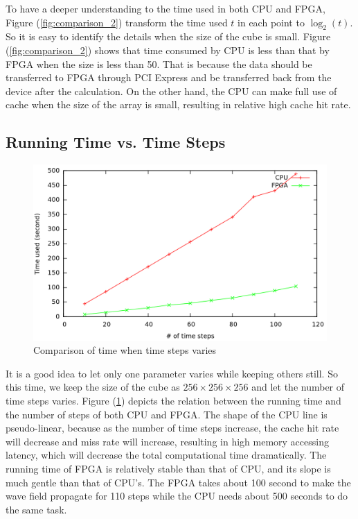 To have a deeper understanding to the time used in both CPU and FPGA,
Figure (\ref{fig:comparison_2}) transform the time used \( t \) in each
point to \(\log_2\left( t \right) \). So it is easy to identify the details
when the size of the cube is small. Figure (\ref{fig:comparison_2}) shows
that time consumed by CPU is less than that by FPGA when the size is less
than 50. That is because the data should be transferred to FPGA through PCI
Express and be transferred back from the device after the calculation.
On the other hand, the CPU can make full use of cache when the size of the
array is small, resulting in relative high cache hit rate.


\subsection{Running Time vs.  Time Steps} %

\begin{figure}[h]
  \centering
  \includegraphics[scale=0.32]{img/size256t10to110.png}
  \caption{Comparison of time when time steps varies}
  \label{fig:comparison_3}
\end{figure}

It is a good idea to let only one parameter varies while keeping others
still. So this time, we keep the size of the cube as \( 256 \times 256
\times 256 \) and let the number of time steps varies. Figure
(\ref{fig:comparison_3}) depicts the relation between the running time and
the number of steps of both CPU and FPGA. The shape of the CPU line is 
pseudo-linear, because as the number of time steps increase, the cache hit 
rate will decrease and miss rate will increase, resulting in high memory 
accessing latency, which will decrease the total computational time 
dramatically. The running time of FPGA is relatively stable than that of 
CPU, and its slope is much gentle than that of CPU's. The FPGA takes about 
100 second to make the wave field propagate for 110 steps while the CPU 
needs about 500 seconds to do the same task. 

